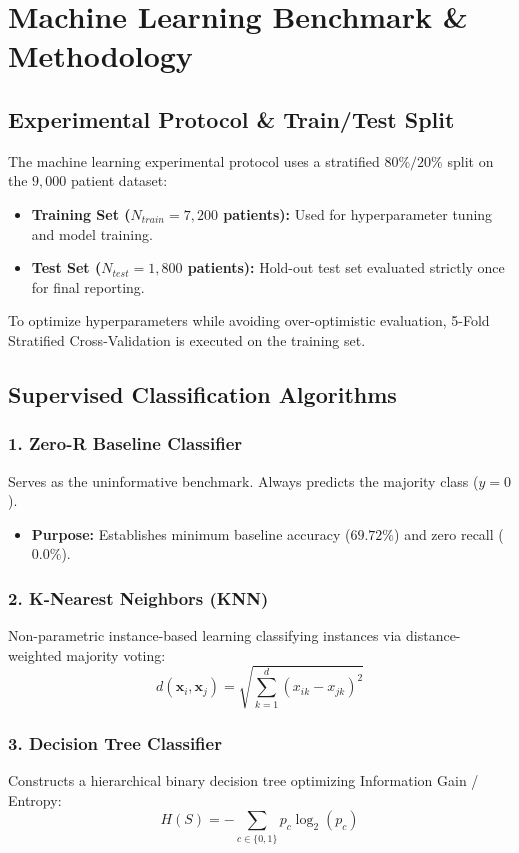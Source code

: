 \chapter{Machine Learning Benchmark \& Methodology}

\section{Experimental Protocol \& Train/Test Split}
The machine learning experimental protocol uses a stratified $80\% / 20\%$ split on the $9,000$ patient dataset:
\begin{itemize}
    \item \textbf{Training Set ($N_{train} = 7,200$ patients):} Used for hyperparameter tuning and model training.
    \item \textbf{Test Set ($N_{test} = 1,800$ patients):} Hold-out test set evaluated strictly once for final reporting.
\end{itemize}

To optimize hyperparameters while avoiding over-optimistic evaluation, 5-Fold Stratified Cross-Validation is executed on the training set.

\section{Supervised Classification Algorithms}

\subsection{1. Zero-R Baseline Classifier}
Serves as the uninformative benchmark. Always predicts the majority class ($y = 0$).
\begin{itemize}
    \item \textbf{Purpose:} Establishes minimum baseline accuracy ($69.72\%$) and zero recall ($0.0\%$).
\end{itemize}

\subsection{2. K-Nearest Neighbors (KNN)}
Non-parametric instance-based learning classifying instances via distance-weighted majority voting:
\begin{equation}
d(\mathbf{x}_i, \mathbf{x}_j) = \sqrt{\sum_{k=1}^d (x_{ik} - x_{jk})^2}
\end{equation}

\subsection{3. Decision Tree Classifier}
Constructs a hierarchical binary decision tree optimizing Information Gain / Entropy:
\begin{equation}
H(S) = -\sum_{c \in \{0,1\}} p_c \log_2(p_c)
\end{equation}

